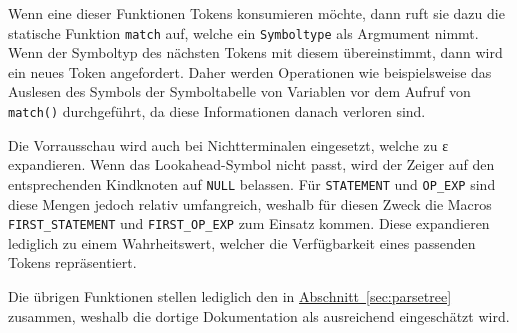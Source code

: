 Wenn eine dieser Funktionen Tokens konsumieren möchte,
dann ruft sie dazu die statische Funktion \texttt{match} auf,
welche ein \texttt{Symboltype} als Argmument nimmt.
Wenn der Symboltyp des nächsten Tokens mit diesem übereinstimmt,
dann wird ein neues Token angefordert.
Daher werden Operationen wie beispielsweise das Auslesen des Symbols der Symboltabelle von Variablen vor dem Aufruf von \texttt{match()} durchgeführt,
da diese Informationen danach verloren sind.

Die Vorrausschau wird auch bei Nichtterminalen eingesetzt,
welche zu ε expandieren.
Wenn das Lookahead-Symbol nicht passt,
wird der Zeiger auf den entsprechenden Kindknoten auf \texttt{NULL} belassen.
Für \texttt{STATEMENT} und \texttt{OP\_EXP} sind diese Mengen jedoch relativ umfangreich,
weshalb für diesen Zweck die Macros \texttt{FIRST\_STATEMENT} und \texttt{FIRST\_OP\_EXP} zum Einsatz kommen.
Diese expandieren lediglich zu einem Wahrheitswert,
welcher die Verfügbarkeit eines passenden Tokens repräsentiert.

Die übrigen Funktionen stellen lediglich den in \hyperref[sec:parsetree]{Abschnitt~\ref{sec:parsetree}} zusammen,
weshalb die dortige Dokumentation als ausreichend eingeschätzt wird.
